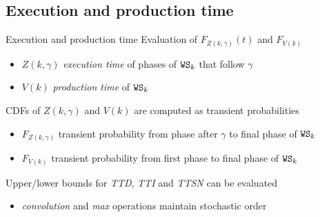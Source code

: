   \subsection{Execution and production time}
    \begin{frame}{Execution and production time}
      Evaluation of $F_{Z(k,\gamma)}(t)$ and $F_{V(k)}$
      \begin{itemize}
        \item $Z(k,\gamma)$ \textit{execution time} of phases of $\mathtt{WS}_k$ that follow $\gamma$
        \item $V(k)$ \textit{production time} of $\mathtt{WS}_k$
      \end{itemize}
    
      \vspace{1em}
      CDFs of $Z(k,\gamma)$ and $V(k)$ are computed as transient probabilities
      
      \begin{itemize}
        \item $F_{Z(k,\gamma)}$ transient probability from phase after $\gamma$ to final phase of $\mathtt{WS}_k$
        \item $F_{V(k)}$ transient probability from first phase to final phase of $\mathtt{WS}_k$
      \end{itemize}
      
      \vspace{2em}
      Upper/lower bounds for \textit{TTD}, \textit{TTI} and \textit{TTSN} can be evaluated
      \begin{itemize}
        \item \textit{convolution} and \textit{max} operations maintain stochastic order
      \end{itemize}
    \end{frame}